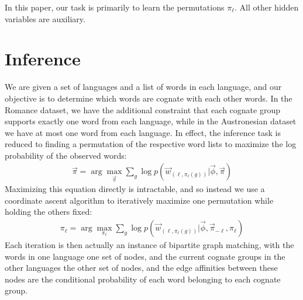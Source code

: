 \documentclass[11pt,a4paper]{article}
\begin{document}
In this paper, our task is primarily to learn the permutations
$\pi_\ell$. All other hidden variables are auxiliary.

\section{Inference}

We are given a set of languages and a list of words in each language,
and our objective is to determine which words are cognate with each
other words. In the Romance dataset, we have the additional constraint
that each cognate group supports exactly one word from each language,
while in the Austronesian dataset we have at most one word from each
language. In effect, the inference task is reduced to finding a
permutation of the respective word lists to maximize the log
probability of the observed words:
\begin{equation}
  \begin{split}
    \vec{\pi} = \arg\!\max_{\vec \pi} \sum_{g} \log p(\vec w_{(\ell,\pi_\ell(g))}|\vec \phi,\vec \pi)
   \end{split}
 \end{equation}
Maximizing this equation directly is intractable, and so instead
we use a coordinate ascent algorithm to iteratively maximize one
permutation while holding the others fixed:
\begin{equation}
  \begin{split}
    \pi_\ell = \arg\!\max_{\pi_\ell} \sum_{g} \log p(\vec w_{(\ell,\pi_\ell(g))}|\vec \phi,\vec \pi_{-\ell},\pi_\ell)
  \end{split}
\end{equation}
Each iteration is then actually an instance of bipartite graph
matching, with the words in one language one set of nodes, and the
current cognate groups in the other languages the other set of
nodes, and the edge affinities between these nodes are the conditional
probability of each word belonging to each cognate group.
\end{document}
